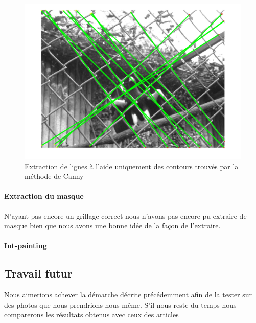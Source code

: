 \documentclass[10pt,a4paper]{article}
\begin{document}
\begin{figure}[h]
\begin{center}
\includegraphics[scale=0.3]{fig/hough.png}
\caption{\label{hough}Extraction de lignes à l'aide uniquement des contours trouvés par la méthode de Canny}
\end{center}
\end{figure}

\paragraph{Extraction du masque} N'ayant pas encore un grillage correct nous n'avons pas encore pu extraire de masque bien que nous avons une bonne idée de la façon de l'extraire.

\paragraph{Int-painting}

\subsection{Travail futur}
Nous aimerions achever la démarche décrite précédemment afin de la tester sur des photos que nous prendrions nous-même. S'il nous reste du temps nous comparerons les résultats obtenus avec ceux des articles \cite{YLiu2008}



\end{document}
